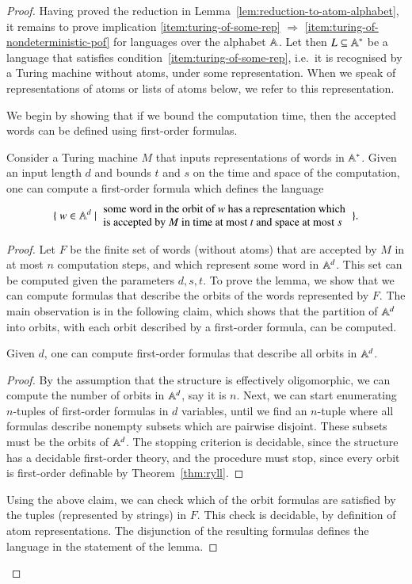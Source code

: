 \begin{proof}
	Having proved the reduction in Lemma~\ref{lem:reduction-to-atom-alphabet}, it remains to prove implication \ref{item:turing-of-some-rep} $\Rightarrow$ \ref{item:turing-of-nondeterministic-pof} for languages over the alphabet $\mathbb A$. Let then $L \subseteq \mathbb A^*$ be a language that satisfies condition~\ref{item:turing-of-some-rep}, i.e.~it is recognised by a Turing machine without atoms, under some representation. When we speak of representations of atoms or lists of atoms below, we refer to this representation.

	We begin by showing that if we bound  the computation time, then the accepted words can be defined using first-order formulas.

	\begin{lemma}\label{lem:compute-first-order-formula} Consider a Turing machine $M$ that inputs representations of words in $\mathbb A^*$. 
		Given an input length $d$ and bounds $t$ and $s$ on the time and space of the computation, one can compute a first-order formula which defines the language 
		\begin{align*}
		\setbuild{ w \in \atoms^d}{ some word in the orbit of $w$ has a representation  which  \\ is accepted by $M$ in time at most $t$ and space at most $s$ }.
		\end{align*}
	\end{lemma}
	\begin{proof}
		Let $F$ be the finite set of words (without atoms) that are accepted by $M$ in at most $n$ computation steps, and which represent some word in $\mathbb A^d$. This set can be computed given the parameters $d,s,t$.  To prove the lemma, we show that  we can compute formulas that describe the orbits of the words represented by  $F$. The main observation is in the following claim, which shows that the partition of $\mathbb A^d$ into orbits, with each orbit described by a first-order formula, can be computed.
		\begin{claim}\label{claim:compute-orbit-formulas}
			Given $d$, one can compute first-order formulas that describe all orbits in $\mathbb A^d$.
		\end{claim}
		\begin{proof}
			By the assumption that the structure is effectively oligomorphic, we can compute the number of orbits in $\mathbb A^d$, say it is $n$. Next, we can start enumerating $n$-tuples of first-order formulas in $d$ variables, until we find an $n$-tuple where all formulas describe nonempty subsets which are pairwise disjoint. These subsets must be the orbits of $\mathbb A^d$.  The stopping criterion is decidable, since the structure has a decidable first-order theory, and the procedure must stop, since every orbit is first-order definable by Theorem~\ref{thm:ryll}. 
		\end{proof}
		Using the above claim, we can check which of the orbit formulas are satisfied by the tuples (represented by strings) in $F$. This check is decidable, by definition of atom representations.  The disjunction of the resulting formulas defines  the language in the statement of the lemma.
	\end{proof}
	

\end{proof}
